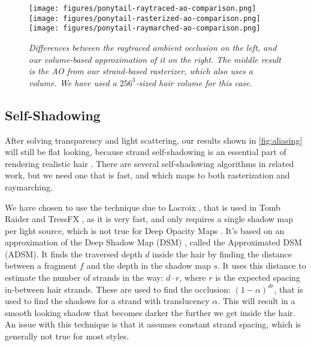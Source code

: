 \documentclass{egpubl}
\begin{document}
\begin{figure}[htb]
    \centering
    \texttt{[image: figures/ponytail-raytraced-ao-comparison.png]}
    \texttt{[image: figures/ponytail-rasterized-ao-comparison.png]}
    \texttt{[image: figures/ponytail-raymarched-ao-comparison.png]}
    \caption{\emph{Differences between the raytraced ambient occlusion on the left, and our volume-based approximation of it on the right. The middle result is the AO from our strand-based rasterizer, which also uses a volume. We have used a $256^3$-sized hair volume for this case.}}
    \label{fig:ambient_occlusion}
    \vspace{-6mm}
\end{figure}


\subsection{Self-Shadowing} \label{sec:self-shadowing}


After solving transparency and light scattering, our results shown in \cref{fig:aliasing} will still be flat looking, because strand self-shadowing is an essential part of rendering realistic hair \cite{ward2007survey}. There are several self-shadowing algorithms in related work, but we need one that is fast, and which maps to both rasterization and raymarching.

We have chosen to use the technique due to Lacroix \cite{lacroix2013tressfx}, that is used in Tomb Raider and TressFX \cite{martin2014tressfx, steward2015augmented}, as it is very fast, and only requires a single shadow map per light source, which is not true for Deep Opacity Maps \cite{yuksel2008deep}. It's based on an approximation of the Deep Shadow Map (DSM) \cite{lokovic2000deep}, called the Approximated DSM (ADSM). It finds the traversed depth $d$ inside the hair by finding the distance between a fragment $f$ and the depth in the shadow map $s$. It uses this distance to estimate the number of strands in the way: $d \cdot r$, where $r$ is the expected spacing in-between hair strands. These are used to find the occlusion: $(1 - \alpha)^{dr}$, that is used to find the shadows for a strand with translucency $\alpha$. This will result in a smooth looking shadow that becomes darker the further we get inside the hair. An issue with this technique is that it assumes constant strand spacing, which is generally not true for most styles.
\end{document}
